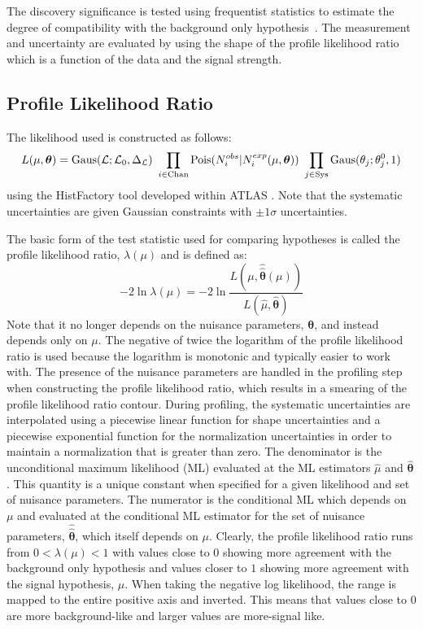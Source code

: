 The discovery significance is tested using frequentist statistics
to estimate the degree of compatibility with the background only 
hypothesis~\cite{Cowan:1277304}.
The measurement and uncertainty are evaluated 
by using the shape of the profile likelihood ratio~\cite{PDG:2014} 
which is a function of the data and the signal strength.

\subsection{Profile Likelihood Ratio}

The likelihood used is constructed as follows:
\begin{equation}
L(\mu,\boldsymbol{\theta}) = \mathrm{Gaus}(\mathcal{L};\mathcal{L}_0,\Delta_{\mathcal{L}})~\prod_{i\in\mathrm{Chan}} \mathrm{Pois}(N_i^{obs}|N_i^{exp}(\mu,\boldsymbol{\theta}))~\prod_{j\in\mathrm{Sys}} \mathrm{Gaus}(\theta_j;\theta_j^0,1)
\label{eq:poisson_likelihood}
\end{equation}
using the HistFactory tool developed within ATLAS \cite{Cranmer:1456844}. 
Note that the systematic uncertainties are given Gaussian 
constraints with $\pm1\sigma$ uncertainties.

The basic form of the 
test statistic used for comparing hypotheses is called the profile likelihood 
ratio, $\lambda(\mu)$ and is defined as:
\begin{equation}
-2 \ln \lambda(\mu) = -2 \ln \frac{L(\mu,\hat{\hat{\boldsymbol{\theta}}}(\mu))}{L(\hat{\mu},\hat{\boldsymbol{\theta}})}
\label{eq:profile_likelihood_ratio}
\end{equation}
Note that it no longer depends on the nuisance parameters, $\boldsymbol{\theta}$,
and instead depends only on $\mu$. 
The negative of twice the logarithm of the profile likelihood 
ratio is used because
the logarithm is monotonic and typically easier to work with.
The presence of the nuisance parameters are handled in the profiling 
step when constructing the profile likelihood ratio,  which results 
in a smearing of the profile likelihood ratio contour. 
During profiling, the systematic uncertainties are
interpolated using a piecewise linear function for shape uncertainties
and a piecewise exponential function for the normalization uncertainties
in order to maintain a normalization that is greater than zero.
The denominator is the 
unconditional maximum likelihood (ML)
evaluated at the ML estimators $\hat{\mu}$ and $\hat{\boldsymbol{\theta}}$.
This quantity is a unique constant when specified for a given likelihood
and set of nuisance parameters.
The numerator is the conditional ML which depends on $\mu$ and
evaluated at 
the conditional ML estimator for the set of nuisance parameters, 
$\hat{\hat{\boldsymbol{\theta}}}$, which itself depends on $\mu$.
Clearly, the profile likelihood ratio runs from $0 < \lambda(\mu) < 1$
with values close to $0$ showing more agreement with the background 
only hypothesis and values closer to $1$ showing more agreement with 
the signal hypothesis, $\mu$. 
When taking the negative log likelihood, the range
is mapped to the entire positive axis and inverted. This means
that values close to $0$ are more background-like and larger values 
are more-signal like.  

